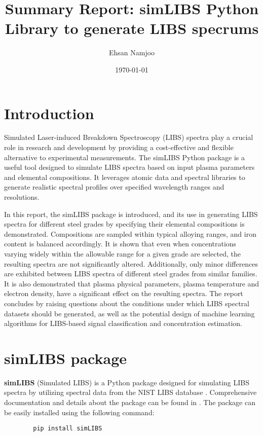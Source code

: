 \documentclass[12pt,a4paper]{article}
\title{Summary Report: simLIBS Python Library to generate LIBS specrums}
\author{Ehsan Namjoo}
\date{\today}
\begin{document}
	
	\maketitle
	\tableofcontents
	\newpage
	\section{Introduction}
	Simulated Laser-induced Breakdown Spectroscopy (LIBS) spectra play a crucial role in research and development by providing a cost-effective and flexible alternative to experimental measurements. The simLIBS Python package is a useful tool designed to simulate LIBS spectra based on input plasma parameters and elemental compositions. It leverages atomic data and spectral libraries to generate realistic spectral profiles over specified wavelength ranges and resolutions.
	
	In this report, the simLIBS package is introduced, and its use in generating LIBS spectra for different steel grades by specifying their elemental compositions is demonstrated. Compositions are sampled within typical alloying ranges, and iron content is balanced accordingly. It is shown that even when concentrations varying widely within the allowable range for a given grade are selected, the resulting spectra are not significantly altered. Additionally, only minor differences are exhibited between LIBS spectra of different steel grades from similar families. It is also demonstrated that plasma physical parameters, plasma temperature and electron density, have a significant effect on the resulting spectra. The report concludes by raising questions about the conditions under which LIBS spectral datasets should be generated, as well as the potential design of machine learning algorithms for LIBS-based signal classification and concentration estimation. 
	
	\section{simLIBS package}
	\textbf{simLIBS} (Simulated LIBS) is a Python package designed for simulating LIBS spectra by utilizing spectral data from the NIST LIBS database \cite{NIST_LIBS}. Comprehensive documentation and details about the package can be found in \cite{simLIBS2024}. The package can be easily installed using the following command:
	
	\vspace{-0.5em}
	\begin{verbatim}
		pip install simLIBS
	\end{verbatim}
	\vspace{-1.5em}
	
\end{document}
